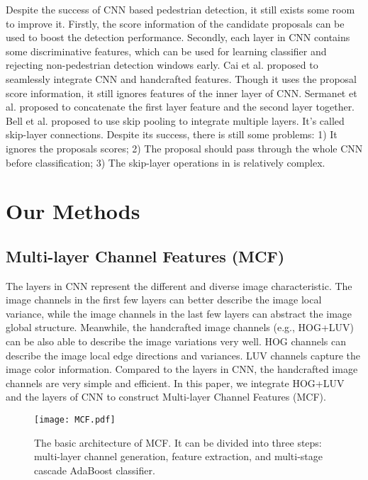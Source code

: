 \documentclass[journal]{IEEEtran}
\begin{document}
Despite the success of CNN based pedestrian detection, it still exists some room to improve it. Firstly, the score information of the candidate proposals can be used to boost the detection performance. Secondly, each layer in CNN contains some discriminative features, which can be used for learning classifier and rejecting non-pedestrian detection windows early. Cai et al. \cite{Cai_CompACT_ICCV_2015} proposed to seamlessly integrate CNN and handcrafted features. Though it uses the proposal score information, it still ignores features of the inner layer of CNN. Sermanet et al. \cite{Sermanet_UMFL_CVPR_2013} proposed to concatenate the first layer feature and the second layer together. Bell et al. \cite{Bell_IONet_arXiv_2015} proposed to use skip pooling to integrate multiple layers. It's called skip-layer connections. Despite its success, there is still some problems: 1) It ignores the proposals scores; 2) The proposal should pass through the whole CNN before classification; 3) The skip-layer operations in \cite{Bell_IONet_arXiv_2015} is relatively complex.


\section{Our Methods}
\subsection{Multi-layer Channel Features (MCF)}
The layers in CNN represent the different and diverse image characteristic. The image channels in the first few layers can better describe the image local variance, while the image channels in the last few layers can abstract the image global structure. Meanwhile, the handcrafted image channels (e.g., HOG+LUV) can be also able to describe the image variations very well. HOG channels can describe the image local edge directions and variances. LUV channels capture the image color information. Compared to the layers in CNN, the handcrafted image channels are very simple and efficient. In this paper, we integrate HOG+LUV and the layers of CNN to construct Multi-layer Channel Features (MCF).

\begin{figure}[!t]
\label{MCF}
\centering
\texttt{[image: MCF.pdf]}
\caption{The basic architecture of MCF. It can be divided into three steps: multi-layer channel generation, feature extraction, and multi-stage cascade AdaBoost classifier.} 
\end{figure}
\end{document}
